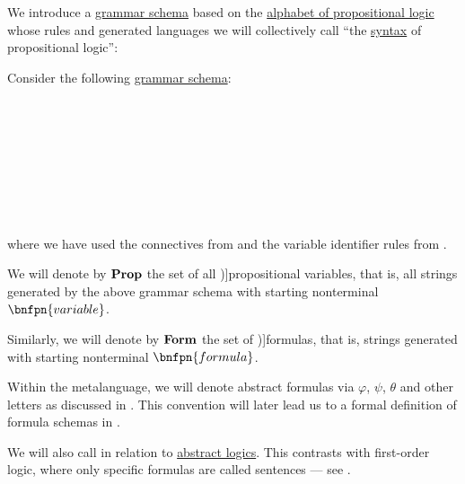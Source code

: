 \begin{definition}\label{def:propositional_syntax}\mimprovised
  We introduce a \hyperref[def:formal_grammar/schema]{grammar schema} based on the \hyperref[def:propositional_alphabet]{alphabet of propositional logic} whose rules and generated languages we will collectively call \enquote{the \hyperref[con:syntax_semantics_duality]{syntax} of propositional logic}:
  \begin{thmenum}
     Consider the following \hyperref[def:formal_grammar/schema]{grammar schema}:
    \begin{bnf*}
                 {} \\
         {\bnftsq{\( \syntop \)} \bnfor \bnftsq{\( \synbot \)}} \\
         {\bnftsq{\( \synneg \)} \bnfsp {}} \\
       {\bnftsq{(} \bnfsp {} \bnfsp {} \bnfsp {} \bnfsp \bnftsq{)}} \\
                  { \bnfor} \\
       \\
       \\
    \end{bnf*}
    where we have used the connectives from  and the variable identifier rules from .

     We will denote by \( \op*{Prop} \) the set of all \term[ru=пропозициональные переменные (\cite[43]{КолмогоровДрагалин2006Логика})]{propositional variables}, that is, all strings generated by the above grammar schema with starting nonterminal \( \bnfpn{variable} \).

     Similarly, we will denote by \( \op*{Form} \) the set of \term[ru=формула (\cite[43]{КолмогоровДрагалин2006Логика})]{formulas}, that is, strings generated with starting nonterminal \( \bnfpn{formula} \).

    Within the metalanguage, we will denote abstract formulas via \( \varphi \), \( \psi \), \( \theta \) and other letters as discussed in . This convention will later lead us to a formal definition of formula schemas in .

    We will also call  in relation to \hyperref[def:abstract_logic]{abstract logics}. This contrasts with first-order logic, where only specific formulas are called sentences --- see .
  \end{thmenum}
\end{definition}
